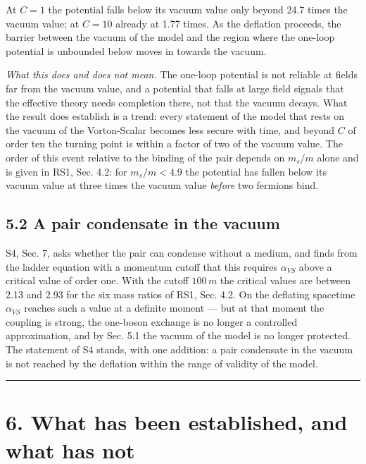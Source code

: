 \documentclass[
  10pt,
]{article}
\begin{document}
At \(C=1\) the potential falls below its vacuum value only beyond 24.7
times the vacuum value; at \(C=10\) already at 1.77 times. As the
deflation proceeds, the barrier between the vacuum of the model and the
region where the one-loop potential is unbounded below moves in towards
the vacuum.

\emph{What this does and does not mean.} The one-loop potential is not
reliable at fields far from the vacuum value, and a potential that falls
at large field signals that the effective theory needs completion there,
not that the vacuum decays. What the result does establish is a trend:
every statement of the model that rests on the vacuum of the
Vorton-Scalar becomes less secure with time, and beyond \(C\) of order
ten the turning point is within a factor of two of the vacuum value. The
order of this event relative to the binding of the pair depends on
\(m_s/m\) alone and is given in RS1, Sec. 4.2: for \(m_s/m<4.9\) the
potential has fallen below its vacuum value at three times the vacuum
value \emph{before} two fermions bind.

\hypertarget{a-pair-condensate-in-the-vacuum}{%
\subsection{5.2 A pair condensate in the
vacuum}\label{a-pair-condensate-in-the-vacuum}}

S4, Sec. 7, asks whether the pair can condense without a medium, and
finds from the ladder equation with a momentum cutoff that this requires
\(\alpha_{VS}\) above a critical value of order one. With the cutoff
\(100\,m\) the critical values are between 2.13 and 2.93 for the six
mass ratios of RS1, Sec. 4.2. On the deflating spacetime \(\alpha_{VS}\)
reaches such a value at a definite moment --- but at that moment the
coupling is strong, the one-boson exchange is no longer a controlled
approximation, and by Sec. 5.1 the vacuum of the model is no longer
protected. The statement of S4 stands, with one addition: a pair
condensate in the vacuum is not reached by the deflation within the
range of validity of the model.

\begin{center}\rule{0.5\linewidth}{0.5pt}\end{center}

\hypertarget{what-has-been-established-and-what-has-not}{%
\section{6. What has been established, and what has
not}\label{what-has-been-established-and-what-has-not}}
\end{document}
